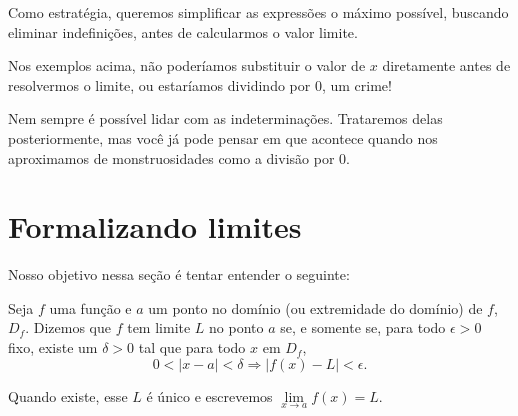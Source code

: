 \documentclass[
  portuguese,
  letterpaper,
  DIV=11,
  numbers=noendperiod]{scrreport}
\begin{document}
\begin{tcolorbox}[enhanced jigsaw, leftrule=.75mm, coltitle=black, title=\textcolor{quarto-callout-tip-color}{\faLightbulb}\hspace{0.5em}{Lidando com indefinições}, colbacktitle=quarto-callout-tip-color!10!white, colback=white, colframe=quarto-callout-tip-color-frame, left=2mm, bottomtitle=1mm, titlerule=0mm, breakable, opacityback=0, opacitybacktitle=0.6, arc=.35mm, toptitle=1mm, rightrule=.15mm, bottomrule=.15mm, toprule=.15mm]

Como estratégia, queremos simplificar as expressões o máximo possível,
buscando eliminar indefinições, antes de calcularmos o valor limite.

Nos exemplos acima, não poderíamos substituir o valor de \(x\)
diretamente antes de resolvermos o limite, ou estaríamos dividindo por
0, um crime!

\end{tcolorbox}

Nem sempre é possível lidar com as indeterminações. Trataremos delas
posteriormente, mas você já pode pensar em que acontece quando nos
aproximamos de monstruosidades como a divisão por \(0\).

\section{Formalizando limites}\label{formalizando-limites}

Nosso objetivo nessa seção é tentar entender o seguinte:

\begin{tcolorbox}[enhanced jigsaw, leftrule=.75mm, coltitle=black, title=\textcolor{quarto-callout-note-color}{\faInfo}\hspace{0.5em}{Definição de limite}, colbacktitle=quarto-callout-note-color!10!white, colback=white, colframe=quarto-callout-note-color-frame, left=2mm, bottomtitle=1mm, titlerule=0mm, breakable, opacityback=0, opacitybacktitle=0.6, arc=.35mm, toptitle=1mm, rightrule=.15mm, bottomrule=.15mm, toprule=.15mm]

Seja \(f\) uma função e \(a\) um ponto no domínio (ou extremidade do
domínio) de \(f\), \(D_f\). Dizemos que \(f\) tem limite \(L\) no ponto
\(a\) se, e somente se, para todo \(\epsilon>0\) fixo, existe um
\(\delta > 0\) tal que para todo \(x\) em \(D_f\), \[
0 < | x-a | < \delta \Rightarrow | f(x) - L | < \epsilon.
\]

Quando existe, esse \(L\) é único e escrevemos
\(\lim\limits_{x \rightarrow a}f(x) = L\).

\end{tcolorbox}
\end{document}
